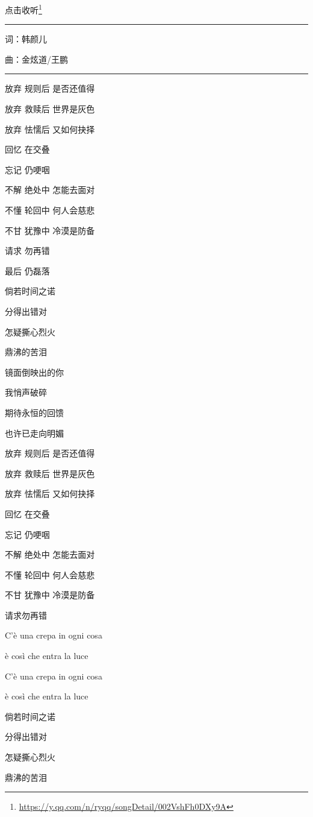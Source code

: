 \documentclass[]{ctexbook}
\renewcommand{\href}[2]{#2\footnote{\url{#1}}}
\begin{document}
\href{https://y.qq.com/n/ryqq/songDetail/002VshFh0DXy9A}{点击收听}

\begin{center}\rule{0.5\linewidth}{0.5pt}\end{center}

词：韩颜儿

曲：金炫道/王鹏

\begin{center}\rule{0.5\linewidth}{0.5pt}\end{center}

放弃 规则后 是否还值得

放弃 救赎后 世界是灰色

放弃 怯懦后 又如何抉择

回忆 在交叠

忘记 仍哽咽

不解 绝处中 怎能去面对

不懂 轮回中 何人会慈悲

不甘 犹豫中 冷漠是防备

请求 勿再错

最后 仍磊落

倘若时间之诺

分得出错对

怎疑撕心烈火

鼎沸的苦泪

镜面倒映出的你

我悄声破碎

期待永恒的回馈

也许已走向明媚

放弃 规则后 是否还值得

放弃 救赎后 世界是灰色

放弃 怯懦后 又如何抉择

回忆 在交叠

忘记 仍哽咽

不解 绝处中 怎能去面对

不懂 轮回中 何人会慈悲

不甘 犹豫中 冷漠是防备

请求勿再错

C'è una crepa in ogni cosa

è così che entra la luce

C'è una crepa in ogni cosa

è così che entra la luce

倘若时间之诺

分得出错对

怎疑撕心烈火

鼎沸的苦泪
\end{document}

